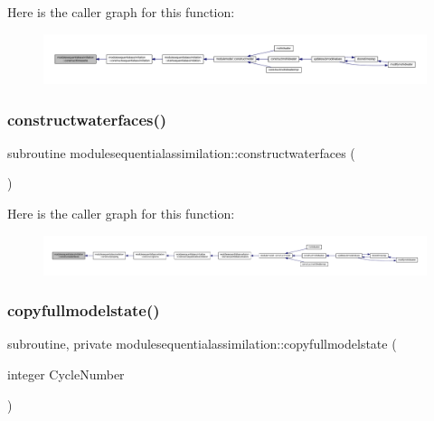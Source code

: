 Here is the caller graph for this function\+:\nopagebreak
\begin{figure}[H]
\begin{center}
\leavevmode
\includegraphics[width=350pt]{namespacemodulesequentialassimilation_a9aa173ea83e0e960fe1561e3a9f183be_icgraph}
\end{center}
\end{figure}
\mbox{\label{namespacemodulesequentialassimilation_a6a108acb64c98821e2a33f354767a9c1}} 
\subsubsection{\texorpdfstring{constructwaterfaces()}{constructwaterfaces()}}
{\footnotesize\ttfamily subroutine modulesequentialassimilation\+::constructwaterfaces (\begin{DoxyParamCaption}{ }\end{DoxyParamCaption})\hspace{0.3cm}{\ttfamily [private]}}

Here is the caller graph for this function\+:\nopagebreak
\begin{figure}[H]
\begin{center}
\leavevmode
\includegraphics[width=350pt]{namespacemodulesequentialassimilation_a6a108acb64c98821e2a33f354767a9c1_icgraph}
\end{center}
\end{figure}
\mbox{\label{namespacemodulesequentialassimilation_a19283cb361ee6cdaa626fd20bad85d11}} 
\subsubsection{\texorpdfstring{copyfullmodelstate()}{copyfullmodelstate()}}
{\footnotesize\ttfamily subroutine, private modulesequentialassimilation\+::copyfullmodelstate (\begin{DoxyParamCaption}\item[{integer}]{Cycle\+Number }\end{DoxyParamCaption})\hspace{0.3cm}{\ttfamily [private]}}

